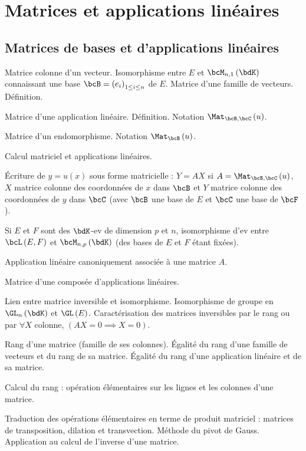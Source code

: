 \documentclass[a4paper,french,bookmarks]{article}
\begin{document}

\section*{Matrices et applications linéaires}

\subsection*{Matrices de bases et d'applications linéaires}

\begin{enumerate}
    \ithand Matrice colonne d'un vecteur. Isomorphisme entre $E$ et $\bcM_{n,1}\left(\bdK\right)$ connaissant une base $\bcB = \left(e_i\right)_{1 \leq i \leq n}$ de $E$. Matrice d'une famille de vecteurs. Définition.

    
    \ithand Matrice d'une application linéaire. Définition. Notation $\Mat_{\bcB,\bcC}\left(u\right)$. 
    
    \ithand Matrice d'un endomorphisme. Notation $\Mat_\bcB\left(u\right)$.
    
    \ithand Calcul matriciel et applications linéaires.
    
    Écriture de $y = u\left(x\right)$ sous forme matricielle : $Y = AX$ si $A = \Mat_{\bcB,\bcC}\left(u\right)$, $X$ matrice colonne des coordonnées de $x$ dans $\bcB$ et $Y$ matrice colonne des coordonnées de $y$ dans $\bcC$ (avec $\bcB$ une base de $E$ et $\bcC$ une base de $\bcF$).
    
    \ithand Si $E$ et $F$ sont des $\bdK$-ev de dimension $p$ et $n$, isomorphisme d'ev entre $\bcL\left(E, F\right)$ et $\bcM_{n,p}\left(\bdK\right)$ (des bases de $E$ et $F$ étant fixées). 
    
    Application linéaire canoniquement associée à une matrice $A$.
    
    \ithand Matrice d'une composée d'applications linéaires.
    
    \ithand Lien entre matrice inversible et isomorphisme. Isomorphisme de groupe en $\GL_n\left(\bdK\right)$ et $\GL\left(E\right)$. Caractérisation des matrices inversibles par le rang ou par $\forall X$ colonne, $\left(AX = 0 \implies X = 0\right)$.
    
    \ithand Rang d'une matrice (famille de ses colonnes). Égalité du rang d'une famille de vecteurs et du rang de sa matrice. Égalité du rang d'une application linéaire et de sa matrice.
    
    \ithand Calcul du rang : opération élémentaires sur les lignes et les colonnes d'une matrice.
    
    Traduction des opérations élémentaires en terme de produit matriciel : matrices de transposition, dilation et transvection. Méthode du pivot de Gauss. Application au calcul de l'inverse d'une matrice.

\end{enumerate}
\end{document}
